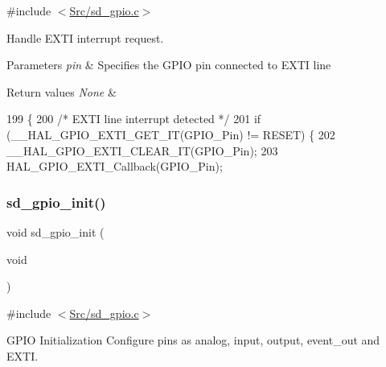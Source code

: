 {\ttfamily \#include $<$\mbox{\hyperlink{sd__gpio_8c}{Src/sd\+\_\+gpio.\+c}}$>$}



Handle E\+X\+TI interrupt request. 


\begin{DoxyParams}{Parameters}
{\em pin} & Specifies the G\+P\+IO pin connected to E\+X\+TI line \\
\hline
\end{DoxyParams}

\begin{DoxyRetVals}{Return values}
{\em None} & \\
\hline
\end{DoxyRetVals}

\begin{DoxyCode}
199 \{
200     \textcolor{comment}{/* EXTI line interrupt detected */}
201     \textcolor{keywordflow}{if} (\_\_HAL\_GPIO\_EXTI\_GET\_IT(GPIO\_Pin) != RESET) \{
202         \_\_HAL\_GPIO\_EXTI\_CLEAR\_IT(GPIO\_Pin);
203         HAL\_GPIO\_EXTI\_Callback(GPIO\_Pin);
\end{DoxyCode}
\mbox{\label{group___s_d___g_p_i_o___functions_ga8e151b8cf065d8de5eb8f4908b18072b}} 
\subsubsection{\texorpdfstring{sd\+\_\+gpio\+\_\+init()}{sd\_gpio\_init()}}
{\footnotesize\ttfamily void sd\+\_\+gpio\+\_\+init (\begin{DoxyParamCaption}\item[{void}]{ }\end{DoxyParamCaption})}



{\ttfamily \#include $<$\mbox{\hyperlink{sd__gpio_8c}{Src/sd\+\_\+gpio.\+c}}$>$}



G\+P\+IO Initialization Configure pins as analog, input, output, event\+\_\+out and E\+X\+TI. 

